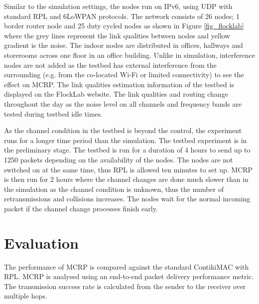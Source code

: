Similar to the simulation settings, the nodes run on IPv6, using UDP with standard RPL and 6LoWPAN protocols. The network consists of 26 nodes; 1 border router node and 25 duty cycled nodes as shown in Figure \ref{fig_flocklab} where the grey lines represent the link qualities between nodes and yellow gradient is the noise. The indoor nodes are distributed in offices, hallways and storerooms across one floor in an office building. Unlike in simulation, interference nodes are not added as the testbed has external interference from the surrounding (e.g. from the co-located Wi-Fi or limited connectivity) to see the effect on MCRP. The link qualities estimation information of the testbed is displayed on the FlockLab website. The link qualities and routing change throughout the day as the noise level on all channels and frequency bands are tested during testbed idle times.

As the channel condition in the testbed is beyond the control, the experiment runs for a longer time period than the simulation. The testbed experiment is in the preliminary stage. The testbed is run for a duration of 4 hours to send up to 1250 packets depending on the availability of the nodes. The nodes are not switched on at the same time, thus RPL is allowed ten minutes to set up. MCRP is then run for 2 hours where the channel changes are done much slower than in the simulation as the channel condition is unknown, thus the number of retransmissions and collisions increases. The nodes wait for the normal incoming packet if the channel change processes finish early.


\section{Evaluation}
The performance of MCRP is compared against the standard ContikiMAC with RPL. MCRP is analysed using an end-to-end packet delivery performance metric. The transmission success rate is calculated from the sender to the receiver over multiple hops. 

